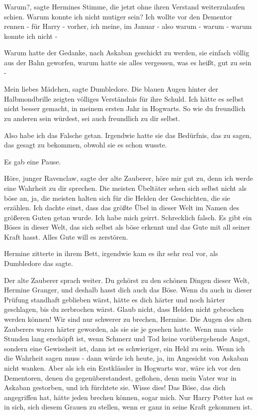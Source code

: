 \glqq Warum?\grqq{}, sagte Hermines Stimme, die jetzt ohne ihren Verstand
weiterzulaufen schien. \glqq Warum konnte ich nicht mutiger sein? Ich wollte vor
den Dementor rennen - für Harry - vorher, ich meine, im Januar - also warum -
warum - warum konnte ich nicht -\grqq{}

Warum hatte der Gedanke, nach Askaban geschickt zu werden, sie einfach völlig
aus der Bahn geworfen, warum hatte sie alles vergessen, was es heißt, gut zu
sein -

\glqq Mein liebes Mädchen\grqq{}, sagte Dumbledore. Die blauen Augen hinter der
Halbmondbrille zeigten völliges Verständnis für ihre Schuld. \glqq Ich hätte es
selbst nicht besser gemacht, in meinem ersten Jahr in Hogwarts. So wie du
freundlich zu anderen sein würdest, sei auch freundlich zu dir selbst.\grqq{}

\glqq Also habe ich das Falsche getan.\grqq{} Irgendwie hatte sie das Bedürfnis,
das zu sagen, das gesagt zu bekommen, obwohl sie es schon wusste.

Es gab eine Pause.

\glqq Höre, junger Ravenclaw\grqq{}, sagte der alte Zauberer, \glqq höre mir gut
zu, denn ich werde eine Wahrheit zu dir sprechen. Die meisten Übeltäter sehen
sich selbst nicht als böse an, ja, die meisten halten sich für die Helden der
Geschichten, die sie erzählen. Ich dachte einst, dass das größte Übel in dieser
Welt im Namen des größeren Guten getan wurde. Ich habe mich geirrt. Schrecklich
falsch. Es gibt ein Böses in dieser Welt, das sich selbst als böse erkennt und
das Gute mit all seiner Kraft hasst. Alles Gute will es zerstören.\grqq{}

Hermine zitterte in ihrem Bett, irgendwie kam es ihr sehr real vor, als
Dumbledore das sagte.

Der alte Zauberer sprach weiter. \glqq Du gehörst zu den schönen Dingen dieser
Welt, Hermine Granger, und deshalb hasst dich auch das Böse. Wenn du auch in
dieser Prüfung standhaft geblieben wärst, hätte es dich härter und noch härter
geschlagen, bis du zerbrochen wärst. Glaub nicht, dass Helden nicht gebrochen
werden können! Wir sind nur schwerer zu brechen, Hermine.\grqq{} Die Augen des
alten Zauberers waren härter geworden, als sie sie je gesehen hatte. \glqq Wenn
man viele Stunden lang erschöpft ist, wenn Schmerz und Tod keine vorübergehende
Angst, sondern eine Gewissheit ist, dann ist es schwieriger, ein Held zu sein.
Wenn ich die Wahrheit sagen muss - dann würde ich heute, ja, im Angesicht von
Askaban nicht wanken. Aber als ich ein Erstklässler in Hogwarts war, wäre ich
vor den Dementoren, denen du gegenüberstandest, geflohen, denn mein Vater war in
Askaban gestorben, und ich fürchtete sie. Wisse dies! Das Böse, das dich
angegriffen hat, hätte jeden brechen können, sogar mich. Nur Harry Potter hat es
in sich, sich diesem Grauen zu stellen, wenn er ganz in seine Kraft gekommen
ist.\grqq{}

